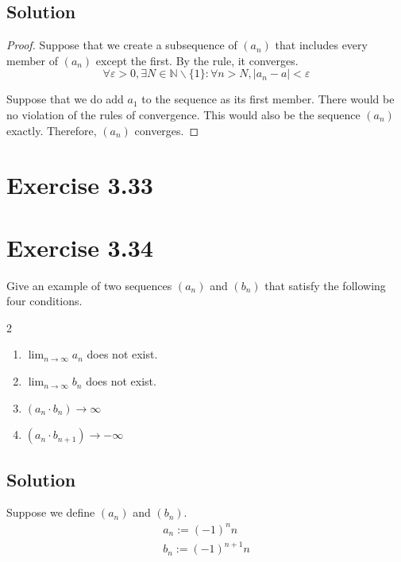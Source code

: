 \documentclass[12pt]{report}
\begin{document}
    \subsection{Solution}
        \begin{proof}
            Suppose that we create a subsequence of $(a_n)$ that includes every member of $(a_n)$ except the first.
            By the rule, it converges.
            \begin{equation}
                \forall \varepsilon > 0, \exists N \in \mathbb{N} \backslash \{1\}: \forall n > N, \left| a_n - a \right| < \varepsilon
            \end{equation}

            Suppose that we do add $a_1$ to the sequence as its first member.
            There would be no violation of the rules of convergence.
            This would also be the sequence $(a_n)$ exactly.
            Therefore, $(a_n)$ converges.
        \end{proof}

\section{Exercise 3.33}

\pagebreak
\section{Exercise 3.34}
    Give an example of two sequences $(a_n)$ and $(b_n)$ that satisfy the following four conditions.
    \begin{multicols}{2}
        \begin{enumerate}[label=(\alph*)]
            \item   $\lim_{n \to \infty} a_n$ does not exist.
            \item   $\lim_{n \to \infty} b_n$ does not exist.
            \item   $(a_n \cdot b_n) \to \infty$
            \item   $(a_n \cdot b_{n+1}) \to -\infty$
        \end{enumerate}
    \end{multicols}

    \subsection{Solution}
        Suppose we define $(a_n)$ and $(b_n)$.
        \begin{gather}
            a_n := (-1)^n n\\
            b_n := (-1)^{n+1} n
        \end{gather}
    \pagebreak
\end{document}
